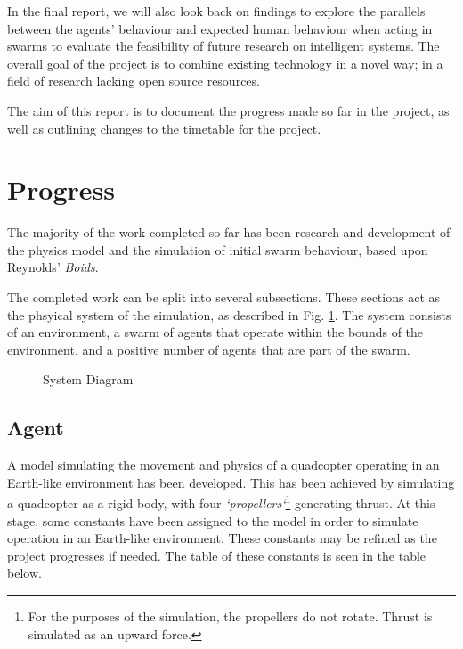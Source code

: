 \documentclass{article}
\begin{document}
In the final report, we will also look back on findings to explore the parallels between the agents' behaviour and expected human behaviour when acting in swarms to evaluate the feasibility of future research on intelligent systems. The overall goal of the project is to combine existing technology in a novel way; in a field of research lacking open source resources.

The aim of this report is to document the progress made so far in the project, as well as outlining changes to the timetable for the project.

\section{Progress}
\label{sec:progress}
The majority of the work completed so far has been research and development of the physics model and the simulation of initial swarm behaviour, based upon Reynolds' \emph{Boids}\cite{Reynolds}.

The completed work can be split into several subsections. These sections act as the phsyical system of the simulation, as described in Fig. \ref{fig:system}. The system consists of an environment, a swarm of agents that operate within the bounds of the environment, and a positive number of agents that are part of the swarm.


\begin{figure}[H]
    \centering
    \caption{System Diagram}
    \label{fig:system}
\end{figure}

\subsection{Agent}
A model simulating the movement and physics of a quadcopter operating in an Earth-like environment has been developed. This has been achieved by simulating a quadcopter as a rigid body, with four \emph{`propellers`}\footnote{For the purposes of the simulation, the propellers do not rotate. Thrust is simulated as an upward force.} generating thrust. At this stage, some constants have been assigned to the model in order to simulate operation in an Earth-like environment. These constants may be refined as the project progresses if needed. The table of these constants is seen in the table below.
\end{document}

